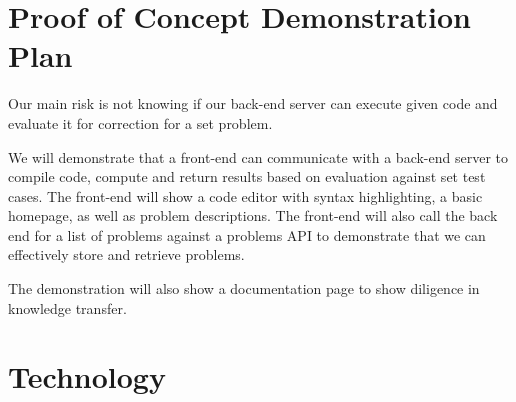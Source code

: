 \documentclass{article}
\begin{document}
\section{Proof of Concept Demonstration Plan}




Our main risk is not knowing if our back-end server can execute given code and evaluate it for correction for a set problem.

We will demonstrate that a front-end can communicate with a back-end server to compile code, compute and return results based on evaluation against set test cases. The front-end will show a code editor with syntax highlighting, a basic homepage, as well as problem descriptions. The front-end will also call the back end for a list of problems against a problems API to demonstrate that we can effectively store and retrieve problems.

The demonstration will also show a documentation page to show diligence in knowledge transfer.

\section{Technology}
\end{document}
